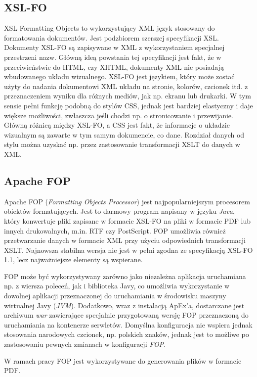 \documentclass[11pt,a4paper]{article}
\begin{document}
\subsection{XSL-FO} \label{tools:xslfo}
XSL Formatting Objects to wykorzystujący XML język stosowany do formatowania dokumentów. Jest podzbiorem szerszej specyfikacji XSL. Dokumenty XSL-FO są zapisywane w XML z wykorzystaniem specjalnej przestrzeni nazw. Główną ideą powstania tej specyfikacji jest fakt, że w przeciwieństwie do HTML, czy XHTML, dokumenty XML nie posiadają wbudowanego układu wizualnego. XSL-FO jest językiem, który może zostać użyty do nadania dokumentowi XML układu na stronie, kolorów, czcionek itd. z przeznaczeniem wyniku dla różnych mediów, jak np. ekranu lub drukarki. W tym sensie pełni funkcję podobną do stylów CSS, jednak jest bardziej elastyczny i daje większe możliwości, zwłaszcza jeśli chodzi np. o stronicowanie i przewijanie. Główną różnicą między XSL-FO, a CSS jest fakt, że informacje o układzie wizualnym są zawarte w tym samym dokumencie, co dane. Rozdział danych od stylu można uzyskać np. przez zastosowanie transformacji XSLT do danych w XML.

\subsection{Apache FOP} \label{tools:fop}
Apache FOP (\emph{Formatting Objects Processor}) jest najpopularniejszym procesorem obiektów formatujących. Jest to darmowy program napisany w języku \emph{Java}, który konwertuje pliki zapisane w formacie XSL-FO na pliki w formacie PDF lub innych drukowalnych, m.in. RTF czy PostScript. FOP umożliwia również przetwarzanie danych w formacie XML przy użyciu odpowiednich transformacji XSLT. Najnowsza stabilna wersja nie jest w pełni zgodna ze specyfikacją XSL-FO 1.1, lecz najważniejsze elementy są wspierane.

FOP może być wykorzystywany zarówno jako niezależna aplikacja uruchamiana np. z wiersza poleceń, jak i biblioteka Javy, co umożliwia wykorzystanie w dowolnej aplikacji przeznaczonej do uruchamiania w środowisku maszyny wirtualnej Javy (\emph{JVM}). Dodatkowo, wraz z instalacją ApEx'a, dostarczane jest archiwum \emph{war} zawierające specjalnie przygotowaną wersję FOP przeznaczoną do uruchamiania na kontenerze serwletów. Domyślna konfiguracja nie wspiera jednak stosowania narodowych czcionek, np. polskich znaków, jednak jest to możliwe po zastosowaniu pewnych zmianach w konfiguracji \emph{FOP}. 

W ramach pracy FOP jest wykorzystywane do generowania plików w formacie PDF.
\end{document}
